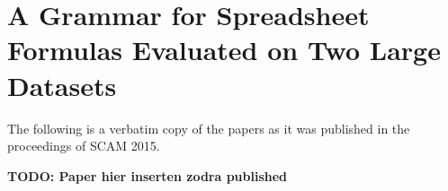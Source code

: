 \documentclass[12pt,a4paper,onecolumn,oneside,parskip]{memoir}
\newcommand{\todo}[1]{\textbf{TODO: #1}}
\begin{document}
\chapter{A Grammar for Spreadsheet Formulas Evaluated on Two Large Datasets}

The following is a verbatim copy of the papers as it was published in the proceedings of SCAM 2015.

\todo{Paper hier inserten zodra published}



\end{document}
